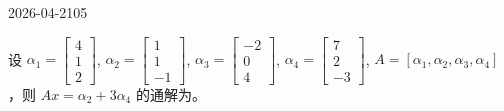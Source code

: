 \begin{mistake}{2026-04-21}{05}

\begin{problemcontent}
设 \(\alpha_1 = \begin{bmatrix} 4 \\ 1 \\ 2 \end{bmatrix}\), \(\alpha_2 = \begin{bmatrix} 1 \\ 1 \\ -1 \end{bmatrix}\), \(\alpha_3 = \begin{bmatrix} -2 \\ 0 \\ 4 \end{bmatrix}\), \(\alpha_4 = \begin{bmatrix} 7 \\ 2 \\ -3 \end{bmatrix}\), \(A = [\alpha_1, \alpha_2, \alpha_3, \alpha_4]\)，则 \(Ax = \alpha_2 + 3\alpha_4\) 的通解为\underline{\hspace{2cm}}。
\end{problemcontent}


\end{mistake}

